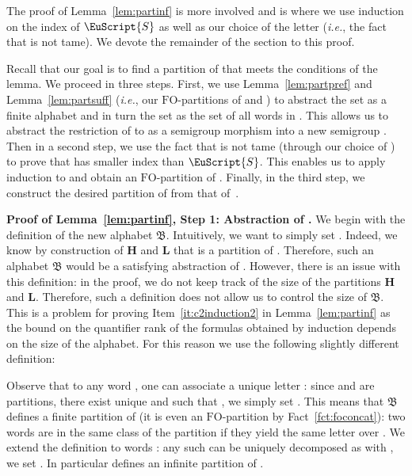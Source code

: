 \documentclass{CSML}
\newcommand\Ss{\ensuremath{\EuScript{S}}\xspace}
\newcommand\Lb{\ensuremath{\mathbf{L}}\xspace}
\newcommand\Hb{\ensuremath{\mathbf{H}}\xspace}
\newcommand{\fo}{\ensuremath{\text{FO}}\xspace}
\theoremstyle{plain}
\begin{document}
The proof of Lemma~\ref{lem:partinf} is more involved and is where we
use induction on the index of \Ss as well as our choice of the letter
 (\emph{i.e.}, the fact that  is not tame). We devote the remainder
of the section to this proof.

\newcommand\frB{\ensuremath{\mathfrak{B}}\xspace}
\newcommand\frL{\ensuremath{\mathfrak{L}}\xspace}
\newcommand\frS{\ensuremath{\mathfrak{S}}\xspace}
\newcommand\frb{\ensuremath{\mathfrak{b}}\xspace}
\newcommand\frw{\ensuremath{\mathfrak{u}}\xspace}
\newcommand\pred{\ensuremath{\text{pred}}\xspace}

Recall that our goal is to find a partition of  that
meets the conditions of the lemma.  We proceed in three steps.
First, we use Lemma~\ref{lem:partpref} and Lemma~\ref{lem:partsuff}
(\emph{i.e.}, our \fo-partitions of  and ) to abstract the set
 as a finite alphabet  and in turn the set 
as the set of all words in . This allows us to abstract the
restriction of  to  as a semigroup morphism
 into a new semigroup .
Then in a second step, we use the fact that  is not tame
(through our choice of ) to prove that  has smaller index than
\Ss. This enables us to apply induction to  and obtain an
\fo-partition of . Finally, in the third step, we construct
the desired partition of  from that of~.

\medskip
\noindent
{\bf Proof of Lemma~\ref{lem:partinf}, Step 1: Abstraction of
  .} We begin with the definition of the new alphabet
\frB. Intuitively, we want to simply set .
Indeed, we know by construction of \Hb and \Lb that  is a partition of . Therefore,
such an alphabet \frB would be a satisfying abstraction of .
However, there is an issue with this definition: in the proof, we do
not keep track of the size of the partitions \Hb and \Lb. Therefore,
such a definition does not allow us to control the size of \frB. This
is a problem for proving Item~\ref{it:c2induction2} in
Lemma~\ref{lem:partinf} as the bound on the quantifier rank of the
formulas obtained by induction depends on the size of the alphabet.
For this reason we use the following slightly different definition:

Observe that to any word , one can associate a unique
letter : since  and  are partitions,
there exist unique  and  such that ,
we simply set . This means that \frB
defines a finite partition of  (it is even an \fo-partition
by Fact~\ref{fct:foconcat}): two words are in the same class of the partition if they yield the same letter over . We extend the definition to words : any such  can be uniquely decomposed as  with , we set . In particular 
defines an infinite partition of .
\end{document}
